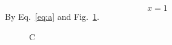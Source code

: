 \documentclass{article}
\begin{document}
\begin{equation} x=1 \label{eq:a}\end{equation}
By Eq.~\eqref{eq:a} and Fig.~\ref{fig:a}.
\begin{figure}\caption{C}\label{fig:a}\end{figure}
\end{document}
